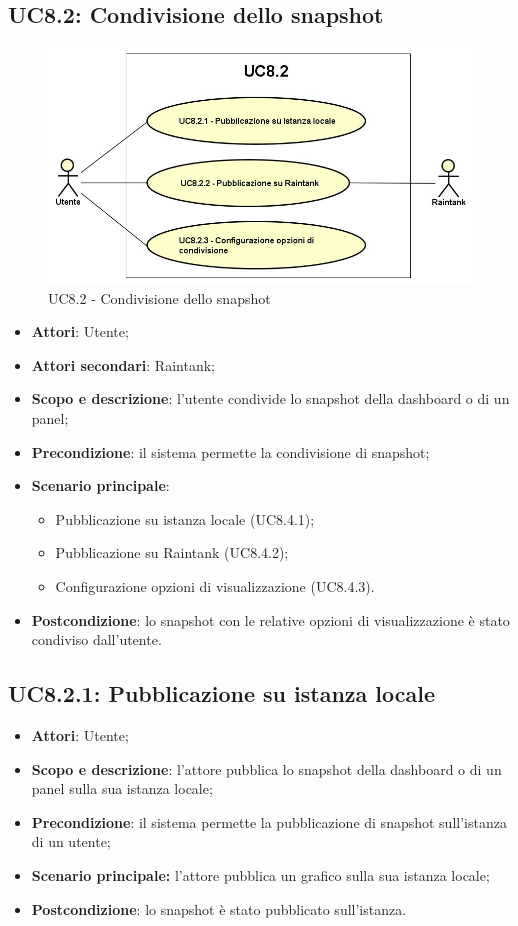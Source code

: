 \subsection{UC8.2: Condivisione dello snapshot}
\hypertarget{UC8.2}{}
\begin{figure} [H]
	\centering
	\includegraphics[scale=0.45]{Img/UC8-2}
	\caption{UC8.2 - Condivisione dello snapshot}\label{}
\end{figure}
\begin{itemize}
	\item \textbf{Attori}: Utente;
	\item \textbf{Attori secondari}: Raintank;
	\item \textbf{Scopo e descrizione}: l'utente condivide lo snapshot della dashboard o di un panel;
	\item \textbf{Precondizione}: il sistema permette la condivisione di snapshot;
	\item \textbf{Scenario principale}:
	\begin{itemize}
		\item Pubblicazione su istanza locale (UC8.4.1);
		\item Pubblicazione su Raintank (UC8.4.2);
		\item Configurazione opzioni di visualizzazione (UC8.4.3).
	\end{itemize}
	\item \textbf{Postcondizione}: lo snapshot con le relative opzioni di visualizzazione è stato condiviso dall'utente.
\end{itemize}

\subsection{UC8.2.1: Pubblicazione su istanza locale}
\hypertarget{UC8.2.1}{}
\begin{itemize}
	\item \textbf{Attori}: Utente;
	\item \textbf{Scopo e descrizione}: l'attore pubblica lo snapshot della dashboard o di un panel sulla sua istanza locale;
	\item \textbf{Precondizione}: il sistema permette la pubblicazione di snapshot sull'istanza di un utente;
	\item \textbf{Scenario principale:} l'attore pubblica un grafico sulla sua istanza locale;
	\item \textbf{Postcondizione}: lo snapshot è stato pubblicato sull'istanza.
\end{itemize}

